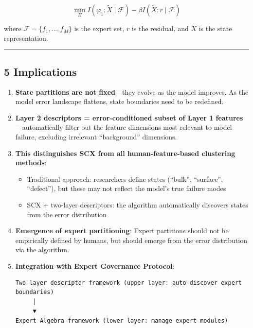 \documentclass[
  12pt,
]{article}
\providecommand{\tightlist}{%
  \setlength{\itemsep}{0pt}\setlength{\parskip}{0pt}}
\begin{document}
\[\min_{\Pi} I(\varphi_1; \tilde{X} \mid \mathcal{F}) - \beta I(\tilde{X}; r \mid \mathcal{F})\]

where \(\mathcal{F} = \{f_1, \dots, f_M\}\) is the expert set, \(r\)
is the residual, and \(\tilde{X}\) is the state representation.

\begin{center}\rule{0.5\linewidth}{0.5pt}\end{center}

\subsection{5 Implications}\label{implications}

\begin{enumerate}
\def\labelenumi{\arabic{enumi}.}
\item
  \textbf{State partitions are not fixed}---they evolve as the model improves. As the model error landscape flattens, state boundaries need to be redefined.
\item
  \textbf{Layer 2 descriptors = error-conditioned subset of Layer 1 features}---automatically filter out the feature dimensions most relevant to model failure, excluding irrelevant ``background'' dimensions.
\item
  \textbf{This distinguishes SCX from all human-feature-based clustering methods}:

  \begin{itemize}
  \tightlist
  \item
    Traditional approach: researchers define states (``bulk'', ``surface'',
    ``defect''), but these may not reflect the model's true failure modes
  \item
    SCX + two-layer descriptors: the algorithm automatically discovers states from the error distribution
  \end{itemize}
\item
  \textbf{Emergence of expert partitioning}: Expert partitions should not be empirically defined by humans, but should emerge from the error distribution via the algorithm.
\item
  \textbf{Integration with Expert Governance Protocol}:

\begin{verbatim}
Two-layer descriptor framework (upper layer: auto-discover expert boundaries)
     │
     ▼
Expert Algebra framework (lower layer: manage expert modules)
\end{verbatim}
\end{enumerate}
\end{document}
